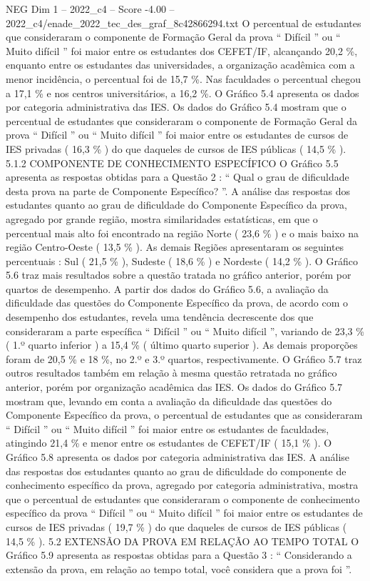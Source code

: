 \begin{textsample}{NEG Dim 1 – 2022\_c4 – Score -4.00 – 2022\_c4/enade\_2022\_tec\_des\_graf\_8c42866294.txt}
O percentual de estudantes que consideraram o componente de Formação Geral da prova “ Difícil ” ou “ Muito difícil ” foi maior entre os estudantes dos CEFET/IF, alcançando 20,2 \%, enquanto entre os estudantes das universidades, a organização acadêmica com a menor incidência, o percentual foi de 15,7 \%.
Nas faculdades o percentual chegou a 17,1 \% e nos centros universitários, a 16,2 \%.
O Gráfico 5.4 apresenta os dados por categoria administrativa das IES.
Os dados do Gráfico 5.4 mostram que o percentual de estudantes que consideraram o componente de Formação Geral da prova “ Difícil ” ou “ Muito difícil ” foi maior entre os estudantes de cursos de IES privadas ( 16,3 \% ) do que daqueles de cursos de IES públicas ( 14,5 \% ). 5.1.2 COMPONENTE DE CONHECIMENTO ESPECÍFICO O Gráfico 5.5 apresenta as respostas obtidas para a Questão 2 : “ Qual o grau de dificuldade desta prova na parte de Componente Específico? ”.
A análise das respostas dos estudantes quanto ao grau de dificuldade do Componente Específico da prova, agregado por grande região, mostra similaridades estatísticas, em que o percentual mais alto foi encontrado na região Norte ( 23,6 \% ) e o mais baixo na região Centro-Oeste ( 13,5 \% ).
As demais Regiões apresentaram os seguintes percentuais : Sul ( 21,5 \% ), Sudeste ( 18,6 \% ) e Nordeste ( 14,2 \% ).
O Gráfico 5.6 traz mais resultados sobre a questão tratada no gráfico anterior, porém por quartos de desempenho.
A partir dos dados do Gráfico 5.6, a avaliação da dificuldade das questões do Componente Específico da prova, de acordo com o desempenho dos estudantes, revela uma tendência decrescente dos que consideraram a parte específica “ Difícil ” ou “ Muito difícil ”, variando de 23,3 \% ( 1.º quarto inferior ) a 15,4 \% ( último quarto superior ).
As demais proporções foram de 20,5 \% e 18 \%, no 2.º e 3.º quartos, respectivamente.
O Gráfico 5.7 traz outros resultados também em relação à mesma questão retratada no gráfico anterior, porém por organização acadêmica das IES.
Os dados do Gráfico 5.7 mostram que, levando em conta a avaliação da dificuldade das questões do Componente Específico da prova, o percentual de estudantes que as consideraram “ Difícil ” ou “ Muito difícil ” foi maior entre os estudantes de faculdades, atingindo 21,4 \% e menor entre os estudantes de CEFET/IF ( 15,1 \% ).
O Gráfico 5.8 apresenta os dados por categoria administrativa das IES.
A análise das respostas dos estudantes quanto ao grau de dificuldade do componente de conhecimento específico da prova, agregado por categoria administrativa, mostra que o percentual de estudantes que consideraram o componente de conhecimento específico da prova “ Difícil ” ou “ Muito difícil ” foi maior entre os estudantes de cursos de IES privadas ( 19,7 \% ) do que daqueles de cursos de IES públicas ( 14,5 \% ). 5.2 EXTENSÃO DA PROVA EM RELAÇÃO AO TEMPO TOTAL O Gráfico 5.9 apresenta as respostas obtidas para a Questão 3 : “ Considerando a extensão da prova, em relação ao tempo total, você considera que a prova foi ”.

\end{textsample}
